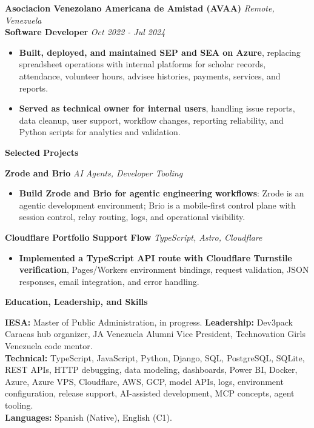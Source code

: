 \documentclass[10pt]{article}
\begin{document}
\vspace{2pt}
\textbf{Asociacion Venezolano Americana de Amistad (AVAA)} \hfill \textit{Remote, Venezuela} \\
\textbf{Software Developer} \hfill \textit{Oct 2022 - Jul 2024}
\begin{itemize}
    \item \textbf{Built, deployed, and maintained SEP and SEA on Azure}, replacing spreadsheet operations with internal platforms for scholar records, attendance, volunteer hours, advisee histories, payments, services, and reports.
    \item \textbf{Served as technical owner for internal users}, handling issue reports, data cleanup, user support, workflow changes, reporting reliability, and Python scripts for analytics and validation.
\end{itemize}

\vspace{3pt}
\begin{center}
    \textbf{Selected Projects}
\end{center}
\vspace{-6pt}

\textbf{Zrode and Brio} \hfill \textit{AI Agents, Developer Tooling}
\begin{itemize}
    \item \textbf{Build Zrode and Brio for agentic engineering workflows}: Zrode is an agentic development environment; Brio is a mobile-first control plane with session control, relay routing, logs, and operational visibility.
\end{itemize}

\vspace{2pt}
\textbf{Cloudflare Portfolio Support Flow} \hfill \textit{TypeScript, Astro, Cloudflare}
\begin{itemize}
    \item \textbf{Implemented a TypeScript API route with Cloudflare Turnstile verification}, Pages/Workers environment bindings, request validation, JSON responses, email integration, and error handling.
\end{itemize}

\vspace{3pt}
\begin{center}
    \textbf{Education, Leadership, and Skills}
\end{center}
\vspace{-6pt}
\textbf{IESA:} Master of Public Administration, in progress. \textbf{Leadership:} Dev3pack Caracas hub organizer, JA Venezuela Alumni Vice President, Technovation Girls Venezuela code mentor. \\
\textbf{Technical:} TypeScript, JavaScript, Python, Django, SQL, PostgreSQL, SQLite, REST APIs, HTTP debugging, data modeling, dashboards, Power BI, Docker, Azure, Azure VPS, Cloudflare, AWS, GCP, model APIs, logs, environment configuration, release support, AI-assisted development, MCP concepts, agent tooling. \\
\textbf{Languages:} Spanish (Native), English (C1).
\end{document}
